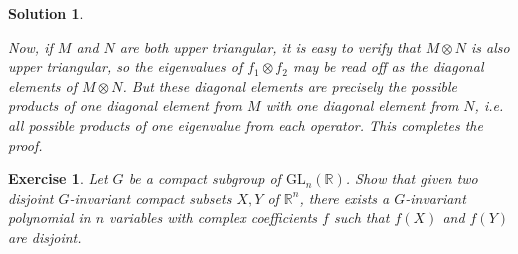 \documentclass{article}
\newtheorem{ex}{Exercise}
\theoremstyle{nonumberplain}
\newtheorem{sol}{Solution}
\newcommand{\R}{\mathbb{R}}
\newcommand{\GL}{\mathrm{GL}}
\begin{document}
\begin{sol}
\begin{enumerate}
Now, if $M$ and $N$ are both upper triangular, it is easy to verify that $M \otimes N$ is also upper triangular, so the eigenvalues of $f_1 \otimes f_2$ may be read off as the diagonal elements of $M \otimes N$. But these diagonal elements are precisely the possible products of one diagonal element from $M$ with one diagonal element from $N$, i.e. all possible products of one eigenvalue from each operator. This completes the proof.
\end{enumerate}
\end{sol}

\begin{ex}
Let $G$ be a compact subgroup of $\GL_n(\R)$. Show that given two disjoint $G$-invariant compact subsets $X, Y$ of $\R^n$, there exists a $G$-invariant polynomial in $n$ variables with complex coefficients $f$ such that $f(X)$ and $f(Y)$ are disjoint.
\end{ex}
\end{document}
